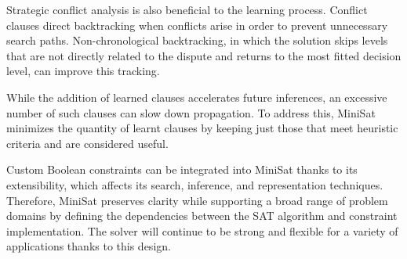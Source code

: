 \documentclass[runningheads]{llncs}
\begin{document}
Strategic conflict analysis is also beneficial to the learning process. Conflict clauses direct backtracking when conflicts arise in order to prevent unnecessary search paths. Non-chronological backtracking, in which the solution skips levels that are not directly related to the dispute and returns to the most fitted decision level, can improve this tracking.

While the addition of learned clauses accelerates future inferences, an excessive number of such clauses can slow down propagation. To address this, MiniSat minimizes the quantity of learnt clauses by keeping just those that meet heuristic criteria and are considered useful.

Custom Boolean constraints can be integrated into MiniSat thanks to its extensibility, which affects its search, inference, and representation techniques. Therefore, MiniSat preserves clarity while supporting a broad range of problem domains by defining the dependencies between the SAT algorithm and constraint implementation. The solver will continue to be strong and flexible for a variety of applications thanks to this design.
\end{document}
